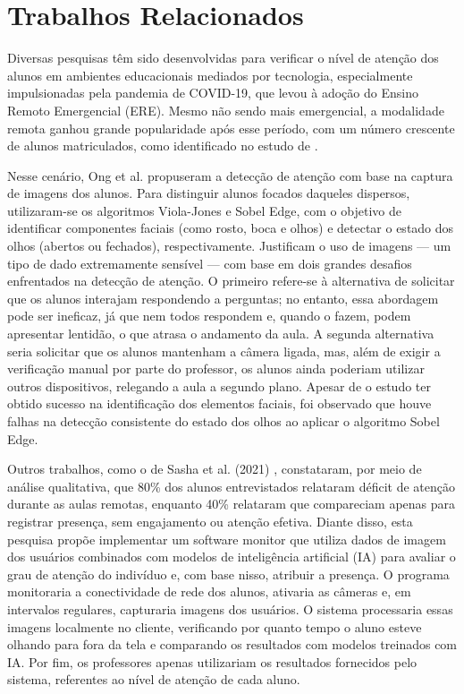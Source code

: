\section{Trabalhos Relacionados}\label{sec:related}
Diversas pesquisas têm sido desenvolvidas para verificar o nível de atenção dos alunos em ambientes educacionais mediados por tecnologia, especialmente impulsionadas pela pandemia de COVID-19, que levou à adoção do Ensino Remoto Emergencial (ERE). Mesmo não sendo mais emergencial, a modalidade remota ganhou grande popularidade após esse período, com um número crescente de alunos matriculados, como identificado no estudo de \cite{moran2009ensino}.

Nesse cenário, Ong et al. \cite{ong2021application} propuseram a detecção de atenção com base na captura de imagens dos alunos. Para distinguir alunos focados daqueles dispersos, utilizaram-se os algoritmos Viola-Jones e Sobel Edge, com o objetivo de identificar componentes faciais (como rosto, boca e olhos) e detectar o estado dos olhos (abertos ou fechados), respectivamente. Justificam o uso de imagens — um tipo de dado extremamente sensível — com base em dois grandes desafios enfrentados na detecção de atenção. O primeiro refere-se à alternativa de solicitar que os alunos interajam respondendo a perguntas; no entanto, essa abordagem pode ser ineficaz, já que nem todos respondem e, quando o fazem, podem apresentar lentidão, o que atrasa o andamento da aula. A segunda alternativa seria solicitar que os alunos mantenham a câmera ligada, mas, além de exigir a verificação manual por parte do professor, os alunos ainda poderiam utilizar outros dispositivos, relegando a aula a segundo plano. Apesar de o estudo ter obtido sucesso na identificação dos elementos faciais, foi observado que houve falhas na detecção consistente do estado dos olhos ao aplicar o algoritmo Sobel Edge.

Outros trabalhos, como o de Sasha et al. (2021) \cite{saha2021attendance}, constataram, por meio de análise qualitativa, que 80\% dos alunos entrevistados relataram déficit de atenção durante as aulas remotas, enquanto 40\% relataram que compareciam apenas para registrar presença, sem engajamento ou atenção efetiva. Diante disso, esta pesquisa propõe implementar um software monitor que utiliza dados de imagem dos usuários combinados com modelos de inteligência artificial (IA) para avaliar o grau de atenção do indivíduo e, com base nisso, atribuir a presença. O programa monitoraria a conectividade de rede dos alunos, ativaria as câmeras e, em intervalos regulares, capturaria imagens dos usuários. O sistema processaria essas imagens localmente no cliente, verificando por quanto tempo o aluno esteve olhando para fora da tela e comparando os resultados com modelos treinados com IA. Por fim, os professores apenas utilizariam os resultados fornecidos pelo sistema, referentes ao nível de atenção de cada aluno.


